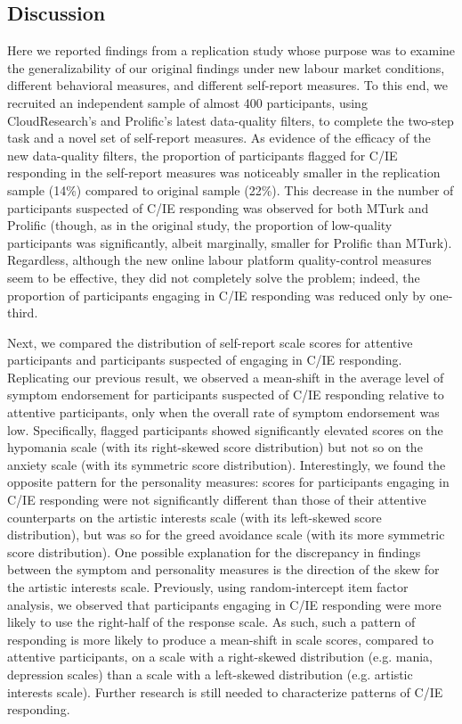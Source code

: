 \documentclass[a4paper,notitlepage,12pt]{article}
\begin{document}
\begin{refsection}[supp]
\subsection*{Discussion}

Here we reported findings from a replication study whose purpose was to examine the generalizability of our original findings under new labour market conditions, different behavioral measures, and different self-report measures. To this end, we recruited an independent sample of almost 400 participants, using CloudResearch's and Prolific's latest data-quality filters, to complete the two-step task and a novel set of self-report measures. As evidence of the efficacy of the new data-quality filters, the proportion of participants flagged for C/IE responding in the self-report measures was noticeably smaller in the replication sample (14\%) compared to original sample (22\%). This decrease in the number of participants suspected of C/IE responding was observed for both MTurk and Prolific (though, as in the original study, the proportion of low-quality participants was significantly, albeit marginally, smaller for Prolific than MTurk). Regardless, although the new online labour platform quality-control measures seem to be effective, they did not completely solve the problem; indeed, the proportion of participants engaging in C/IE responding was reduced only by one-third.

Next, we compared the distribution of self-report scale scores for attentive participants and participants suspected of engaging in C/IE responding. Replicating our previous result, we observed a mean-shift in the average level of symptom endorsement for participants suspected of C/IE responding relative to attentive participants, only when the overall rate of symptom endorsement was low. Specifically, flagged participants showed significantly elevated scores on the hypomania scale (with its right-skewed score distribution) but not so on the anxiety scale (with its symmetric score distribution). Interestingly, we found the opposite pattern for the personality measures: scores for participants engaging in C/IE responding were not significantly different than those of their attentive counterparts on the artistic interests scale (with its left-skewed score distribution), but was so for the greed avoidance scale (with its more symmetric score distribution). One possible explanation for the discrepancy in findings between the symptom and personality measures is the direction of the skew for the artistic interests scale. Previously, using random-intercept item factor analysis, we observed that participants engaging in C/IE responding were more likely to use the right-half of the response scale. As such, such a pattern of responding is more likely to produce a mean-shift in scale scores, compared to attentive participants, on a scale with a right-skewed distribution (e.g. mania, depression scales) than a scale with a left-skewed distribution (e.g. artistic interests scale). Further research is still needed to characterize patterns of C/IE responding. 


\end{refsection}
\end{document}
